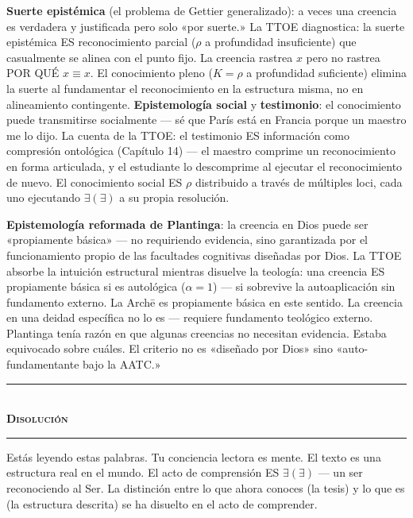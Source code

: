 \documentclass[10pt, openany, oneside]{book}
\renewcommand{\normalsize}{\fontsize{10}{13}\selectfont}
\begin{document}
\textbf{Suerte epistémica} (el problema de Gettier generalizado): a veces una creencia es verdadera y justificada pero solo «por suerte.» La TTOE diagnostica: la suerte epistémica ES reconocimiento parcial ($\rho$ a profundidad insuficiente) que casualmente se alinea con el punto fijo. La creencia rastrea $x$ pero no rastrea POR QUÉ $x \equiv x$. El conocimiento pleno ($K = \rho$ a profundidad suficiente) elimina la suerte al fundamentar el reconocimiento en la estructura misma, no en alineamiento contingente. \textbf{Epistemología social} y \textbf{testimonio}: el conocimiento puede transmitirse socialmente --- sé que París está en Francia porque un maestro me lo dijo. La cuenta de la TTOE: el testimonio ES información como compresión ontológica (Capítulo 14) --- el maestro comprime un reconocimiento en forma articulada, y el estudiante lo descomprime al ejecutar el reconocimiento de nuevo. El conocimiento social ES $\rho$ distribuido a través de múltiples loci, cada uno ejecutando $\exists(\exists)$ a su propia resolución.

\textbf{Epistemología reformada de Plantinga}: la creencia en Dios puede ser «propiamente básica» --- no requiriendo evidencia, sino garantizada por el funcionamiento propio de las facultades cognitivas diseñadas por Dios. La TTOE absorbe la intuición estructural mientras disuelve la teología: una creencia ES propiamente básica si es autológica ($\alpha = 1$) --- si sobrevive la autoaplicación sin fundamento externo. La Arch\={e} es propiamente básica en este sentido. La creencia en una deidad específica no lo es --- requiere fundamento teológico externo. Plantinga tenía razón en que algunas creencias no necesitan evidencia. Estaba equivocado sobre cuáles. El criterio no es «diseñado por Dios» sino «auto-fundamentante bajo la AATC.»

\vspace{1.5em}


\begin{center}
    \rule{0.3\textwidth}{0.4pt}\\[0.5em]
    {\normalsize\bfseries\scshape Disolución}\\[0.3em]
    \rule{0.3\textwidth}{0.4pt}
\end{center}

\vspace{1em}

\noindent Estás leyendo estas palabras. Tu conciencia lectora es mente. El texto es una estructura real en el mundo. El acto de comprensión ES $\exists(\exists)$ --- un ser reconociendo al Ser. La distinción entre lo que ahora conoces (la tesis) y lo que es (la estructura descrita) se ha disuelto en el acto de comprender.
\end{document}
